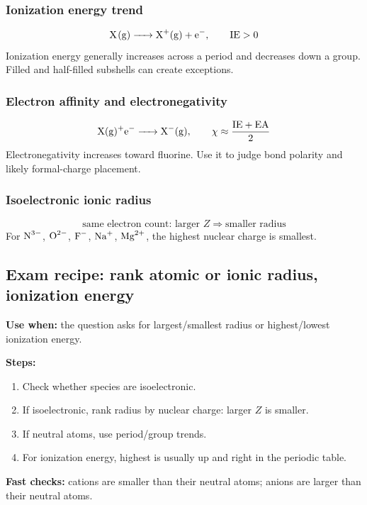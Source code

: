 \subsubsection{Ionization energy trend}
\[
\ce{X(g) -> X+(g) + e-}, \qquad \mathrm{IE}>0
\]
Ionization energy generally increases across a period and decreases down a group. Filled and half-filled subshells can create exceptions.

\subsubsection{Electron affinity and electronegativity}
\[
\ce{X(g)+e- -> X-(g)}, \qquad \chi\approx\frac{\mathrm{IE}+\mathrm{EA}}{2}
\]
Electronegativity increases toward fluorine. Use it to judge bond polarity and likely formal-charge placement.

\subsubsection{Isoelectronic ionic radius}
\[
\text{same electron count: larger }Z\Rightarrow\text{smaller radius}
\]
For \(\ce{N^3-}\), \(\ce{O^2-}\), \(\ce{F-}\), \(\ce{Na+}\), \(\ce{Mg^2+}\), the highest nuclear charge is smallest.

\subsection{Exam recipe: rank atomic or ionic radius, ionization energy}
\textbf{Use when:} the question asks for largest/smallest radius or highest/lowest ionization energy.

\textbf{Steps:}
\begin{enumerate}
    \item Check whether species are isoelectronic.
    \item If isoelectronic, rank radius by nuclear charge: larger \(Z\) is smaller.
    \item If neutral atoms, use period/group trends.
    \item For ionization energy, highest is usually up and right in the periodic table.
\end{enumerate}

\textbf{Fast checks:} cations are smaller than their neutral atoms; anions are larger than their neutral atoms.

